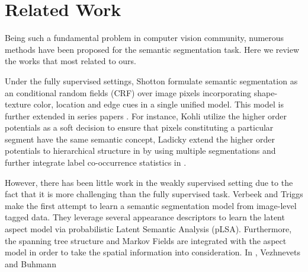 \section{Related Work}
Being such a fundamental problem in computer vision community, numerous methods have been proposed for the semantic segmentation task. Here we review the works that most related to ours.

Under the fully supervised settings, Shotton \etal \cite{shotton2006textonboost} formulate semantic segmentation as an conditional random fields (CRF) over image pixels incorporating shape-texture color, location and edge cues in a single unified model. This model is further extended in series papers \cite{kohli2009robust,ladicky2009associative,ladicky2010graph}. For instance, Kohli \etal utilize the higher order potentials \cite{kohli2009robust} as a soft decision to ensure that pixels constituting a particular segment have the same semantic concept, Ladicky \etal extend the higher order potentials to hierarchical structure in \cite{ladicky2009associative} by using multiple segmentations and further integrate label co-occurrence statistics in \cite{ladicky2010graph}.

However, there has been little work in the weakly supervised setting due to the fact that it is more challenging than the fully supervised task. Verbeek and Triggs \cite{verbeek2007region} make the first attempt to learn a semantic segmentation model from image-level tagged data. They leverage several appearance descriptors to learn the latent aspect model via probabilistic Latent Semantic Analysis (pLSA). Furthermore, the spanning tree structure and Markov Fields are integrated with the aspect model in order to take the spatial information into consideration. In \cite{vezhnevets2010towards}, Vezhnevets and Buhmann 